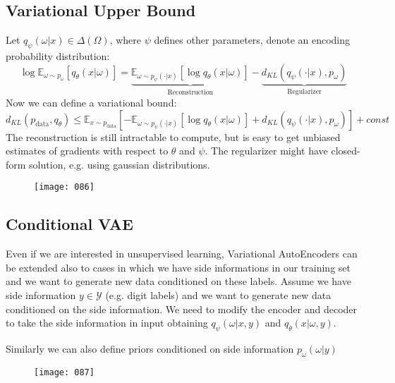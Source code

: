 \subsection{Variational Upper Bound}
Let \(q_\psi (\omega | x) \in \Delta(\Omega)\), where \(\psi\) defines other parameters, denote an encoding probability distribution:
\begin{equation}
    \log \mathbb{E}_{\omega \sim p_\omega} \left[ q_\theta (x | \omega) \right] = \underbrace{ \mathbb{E}_{\omega \sim p_\psi(\cdot | x)} \left[ \log q_\theta (x | \omega) \right] }_\text{Reconstruction} - \underbrace{ d_{KL}(q_\psi(\cdot | x), p_\omega) }_\text{Regularizer}
\end{equation}
Now we can define a variational bound:
\begin{equation}
    d_{KL} (p_\text{data}, q_\theta) \leq \mathbb{E}_{x \sim p_\text{data}} \left[
        - \mathbb{E}_{\omega \sim p_\psi(\cdot | x)} [\log q_\theta (x | \omega)] + d_{KL}(q_\psi(\cdot | x), p_\omega)
    \right] + const
\end{equation}
The reconstruction is still intractable to compute, but is easy to get unbiased estimates of gradients with respect to \(\theta\) and \(\psi\). The regularizer might have closed-form solution, e.g. using gaussian distributions.

\begin{figure}[h!]
    \centering
    \texttt{[image: 086]}
    \caption{}
    \label{fig:086}
\end{figure}

\subsection{Conditional VAE}
Even if we are interested in unsupervised learning, Variational AutoEncoders can be extended also to cases in which we have side informations in our training set and we want to generate new data conditioned on these labels. Assume we have side information \(y \in \mathcal{Y}\) (e.g. digit labels) and we want to generate new data conditioned on the side information. We need to modify the encoder and decoder to take the side information in input obtaining \(q_\psi(\omega | x, y)\) and \(q_\theta(x | \omega, y)\). 

Similarly we can also define priors conditioned on side information \(p_\omega (\omega | y)\)

\begin{figure}[h!]
    \centering
    \texttt{[image: 087]}
    \caption{}
    \label{fig:087}
\end{figure}

